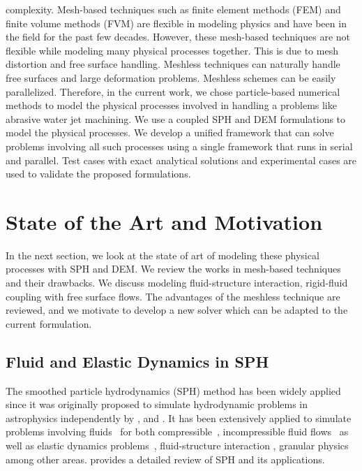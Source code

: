 complexity. Mesh-based techniques such as finite element methods (FEM) and
finite volume methods (FVM) are flexible in modeling physics and have been in
the field for the past few decades. However, these mesh-based techniques are not
flexible while modeling many physical processes together. This is due to mesh
distortion and free surface handling. Meshless techniques can naturally handle
free surfaces and large deformation problems. Meshless schemes can be easily
parallelized. Therefore, in the current work, we chose particle-based numerical
methods to model the physical processes involved in handling a problems like
abrasive water jet machining. We use a coupled SPH and DEM formulations to
model the physical processes. We develop a unified framework that can solve
problems involving all such processes using a single framework that runs in
serial and parallel. Test cases with exact analytical solutions and experimental
cases are used to validate the proposed formulations.




\section{State of the Art and Motivation}
In the next section, we look at the state of art of modeling these physical
processes with SPH and DEM. We review the works in mesh-based techniques and
their drawbacks. We discuss modeling fluid-structure interaction, rigid-fluid
coupling with free surface flows. The advantages of the meshless technique are
reviewed, and we motivate to develop a new solver which can be adapted to the
current formulation.


\subsection{Fluid and Elastic Dynamics in SPH}
The smoothed particle hydrodynamics (SPH) method has been widely applied since
it was originally proposed to simulate hydrodynamic problems in astrophysics
independently by \citet{lucy77}, and \citet{monaghan-gingold-stars-mnras-77}. It
has been extensively applied to simulate problems involving
fluids~\citep{dalrymple2001sph,shao2003incompressible} for both
compressible~\citep{monaghan-review:2005}, incompressible fluid
flows~\citep{sph:fsf:monaghan-jcp94,sph:psph:cummins-rudman:jcp:1999} as well as
elastic dynamics problems~\citep{randles-1996,gray-ed-2001}, fluid-structure
interaction \citep{khayyer2018enhanced,he2017coupled}, granular physics
\citep{bui2008lagrangian,bui2021smoothed} among other areas.
\cite{monaghan2012smoothed} provides a detailed review of SPH and its
applications.

